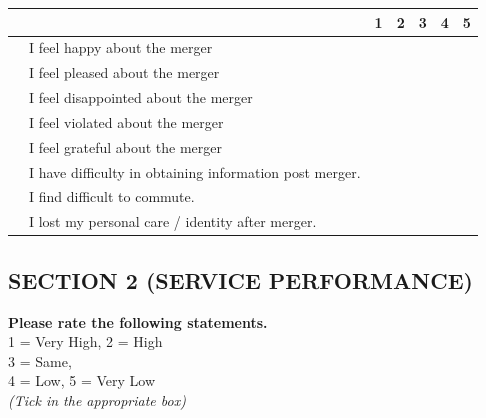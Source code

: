 \documentclass[a4paper, 12pt]{extarticle}
\newcounter{magicrownumbers}
\newcommand\rownumber{\stepcounter{magicrownumbers}\arabic{magicrownumbers}}
\newcommand\tab[1][1cm]{\hspace*{#1}}
\begin{document}
{\begin{minipage}{\textwidth}
\begin{tabular}{|c|l|c|c|c|c|c|}
\hline \multicolumn{2}{|c|}{} & 1 & 2 & 3 & 4 & 5\\
\hline \rownumber & I feel happy about the merger & \tab & \tab & \tab & \tab & \tab \\
\hline \rownumber & I feel pleased about the merger & \tab & \tab & \tab & \tab & \tab \\
\hline \rownumber & I feel disappointed about the merger & \tab & \tab & \tab & \tab & \tab \\
\hline \rownumber & I feel violated about the merger & \tab & \tab & \tab & \tab & \tab \\
\hline \rownumber & I feel grateful about the merger & \tab & \tab & \tab & \tab & \tab \\
\hline \rownumber & I have difficulty in obtaining information post merger. & \tab & \tab & \tab & \tab & \tab \\
\hline \rownumber & I find difficult to commute. & \tab & \tab & \tab & \tab & \tab \\
\hline \rownumber & I lost my personal care / identity after merger. & \tab & \tab & \tab & \tab & \tab \\
\hline
\end{tabular}

\end{minipage}

\newpage
\subsection*{SECTION 2 (SERVICE PERFORMANCE)}
\textbf{Please rate the following statements.}\\
1 = Very High, 2 = High\\
3 = Same,\\
4 = Low, 5 = Very Low\\
\emph {(Tick in the appropriate box)}\\
\begin{minipage}{\textwidth}


\end{minipage}}
\end{document}
